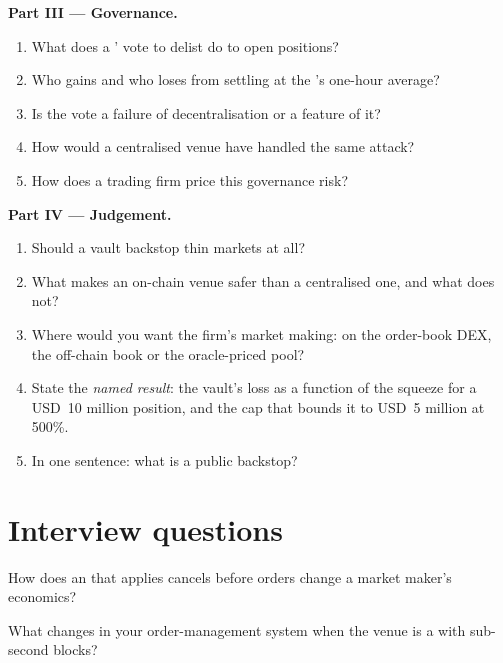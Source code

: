 \begin{problem}
\medskip\noindent\textbf{Part III --- Governance.}
\begin{enumerate}[resume]
\item What does a ' vote to delist do to open positions?
\item Who gains and who loses from settling at the 's one-hour average?
\item Is the vote a failure of decentralisation or a feature of it?
\item How would a centralised venue have handled the same attack?
\item How does a trading firm price this governance risk?
\end{enumerate}

\medskip\noindent\textbf{Part IV --- Judgement.}
\begin{enumerate}[resume]
\item Should a vault backstop thin markets at all?
\item What makes an on-chain venue safer than a centralised one, and what does not?
\item Where would you want the firm's market making: on the order-book DEX, the off-chain book or the oracle-priced pool?
\item State the \emph{named result}: the vault's loss as a function of the squeeze for a USD~10 million position, and the cap that bounds it to USD~5 million at 500\%.
\item In one sentence: what is a public backstop?
\end{enumerate}
\end{problem}

\section{Interview questions}

\begin{interviewq}\label{iq:m3:on-chain-order-books-and-perpetual-dexs:1}
How does an  that applies cancels before orders change a market maker's economics?
\end{interviewq}

\begin{interviewq}\label{iq:m3:on-chain-order-books-and-perpetual-dexs:2}
What changes in your order-management system when the venue is a  with sub-second blocks?
\end{interviewq}


